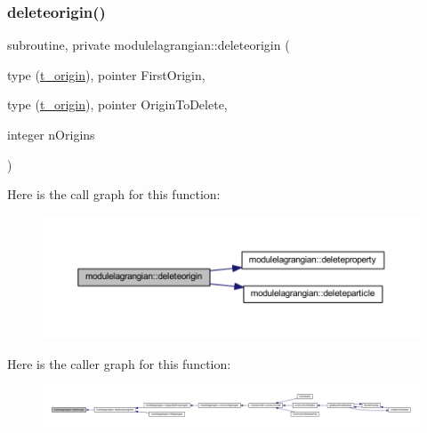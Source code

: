 \subsubsection{\texorpdfstring{deleteorigin()}{deleteorigin()}}
{\footnotesize\ttfamily subroutine, private modulelagrangian\+::deleteorigin (\begin{DoxyParamCaption}\item[{type (\mbox{\hyperlink{structmodulelagrangian_1_1t__origin}{t\+\_\+origin}}), pointer}]{First\+Origin,  }\item[{type (\mbox{\hyperlink{structmodulelagrangian_1_1t__origin}{t\+\_\+origin}}), pointer}]{Origin\+To\+Delete,  }\item[{integer}]{n\+Origins }\end{DoxyParamCaption})\hspace{0.3cm}{\ttfamily [private]}}

Here is the call graph for this function\+:\nopagebreak
\begin{figure}[H]
\begin{center}
\leavevmode
\includegraphics[width=350pt]{namespacemodulelagrangian_a29d4dbfc02fe16a5c49ac6fac8d3e427_cgraph}
\end{center}
\end{figure}
Here is the caller graph for this function\+:\nopagebreak
\begin{figure}[H]
\begin{center}
\leavevmode
\includegraphics[width=350pt]{namespacemodulelagrangian_a29d4dbfc02fe16a5c49ac6fac8d3e427_icgraph}
\end{center}
\end{figure}
\mbox{\label{namespacemodulelagrangian_a0acccf68f63b061b6ad6122ccbe76ac1}} 
